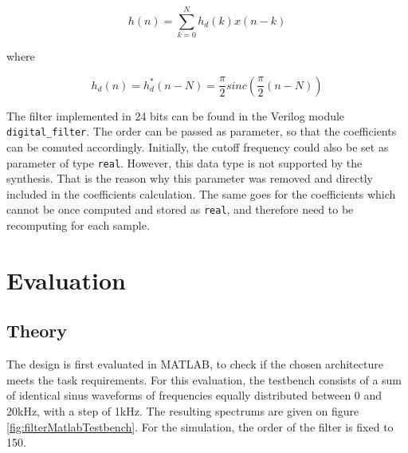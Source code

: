 \[
h(n) = \sum_{k=0}^{N} h_d(k) x(n-k)
\]

where

\[
h_d(n) = h_d^*(n-N) = \frac{\pi}{2} sinc(\frac{\pi}{2} (n-N))
\]

The filter implemented in 24 bits can be found in the Verilog module \texttt{digital\_filter}. The order can be passed as parameter, so that the coefficients can be comuted accordingly. Initially, the cutoff frequency could also be set as parameter of type \texttt{real}. However, this data type is not supported by the synthesis. That is the reason why this parameter was removed and directly included in the coefficients calculation. The same goes for the coefficients which cannot be once computed and stored as \texttt{real}, and therefore need to be recomputing for each sample.

\section{Evaluation}

\subsection{Theory}

The design is first evaluated in MATLAB, to check if the chosen architecture meets the task requirements. For this evaluation, the testbench consists of a sum of identical sinus waveforms of frequencies equally distributed between 0 and 20kHz, with a step of 1kHz. The resulting spectrums are given on figure \ref{fig:filterMatlabTestbench}. For the simulation, the order of the filter is fixed to 150.

